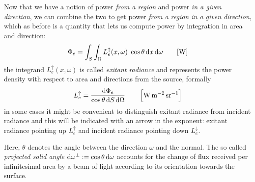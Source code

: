Now that we have a notion of power \textit{from a region} and power \textit{in
a given direction}, we can combine the two to get power \textit{from a region
in a given direction}, which as before is a quantity that lets us compute
power by integration in area and direction:
\begin{displaymath}
\Phi_e = \int_{S} \int_\Omega L_e^\uparrow(x, \omega) \;\cos\theta\mathop{}\!\mathrm{d} x\mathop{}\!\mathrm{d}\omega
\qquad [\si{\watt}]
\end{displaymath}
the integrand $L_e^\uparrow(x, \omega)$ is called \textsl{exitant radiance}
and represents the power density with respect to area and directions from
the source, formally
\begin{displaymath}
L_e^\uparrow = \frac{\d\Phi_e}{\cos\theta \d S \d\Omega}
\qquad \left[\si{\watt\per\square\meter\per\steradian}\right]
\end{displaymath}
in some cases it might be convenient to distinguish exitant radiance from
incident radiance and this will be indicated with an arrow in the exponent:
exitant radiance pointing up $L_e^\uparrow$ and incident radiance pointing down
$L_e^\downarrow$.

Here, $\theta$ denotes the angle between the direction $\omega$ and the normal.
The so called \emph{projected solid angle} $\mathop{}\!\mathrm{d}\omega^\bot := \cos \theta \mathop{}\!\mathrm{d} \omega$
accounts for the change of flux received per infinitesimal area by a beam of light
according to its orientation towards the surface.


